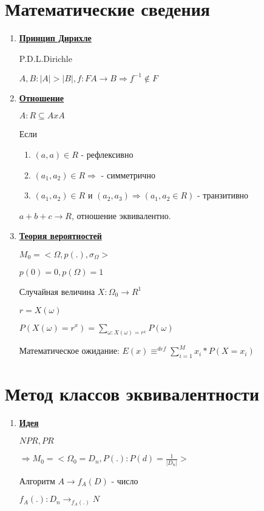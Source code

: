 \documentclass[12pt]{report}
\begin{document}
	\section*{Математические сведения}
	\begin{enumerate}
		\item \textbf{\underline{Принцип Дирихле}}\par
		P.D.L.Dirichle \par
		$A, B: |A| > |B|, f:F A\rightarrow B\Rightarrow f^{-1}\notin F$
		\item \textbf{\underline{Отношение}}\par
		$A: R \subseteq A x A$\par
		Если \begin{enumerate}
			\item $(a,a)\in R$ - рефлексивно
			\item $(a_1,a_2)\in R \Rightarrow$ - симметрично
			\item $(a_1,a_2)\in R$ и $(a_2,a_3)\Rightarrow (a_1,a_2\in R)$ - транзитивно
		\end{enumerate}\par
		$a + b + c\rightarrow R$, отношение эквивалентно.
		\item \textbf{\underline{Теория вероятностей}}\par
		$M_0 = <\Omega , p(.),\sigma_{\Omega}>$\par
		$p(0)=0,p(\Omega)=1$\par
		Случайная величина $X:\Omega_0 \rightarrow R^1$\par
		$r = X(\omega)$\par
		$P(X(\omega)=r^x)=\sum_{\omega :X(\omega)=r^x}P(\omega)$\par
		Математическое ожидание: $E(x)\equiv^{def} \sum_{i=1}^{M}x_i*P(X=x_i)$\par

	\end{enumerate}

	\section*{Метод классов эквивалентности}
	\begin{enumerate}
		\item \textbf{\underline{Идея}}\par
		$NPR,PR$\par
		$\Rightarrow M_0 = <\Omega_0=D_n, P(.):P(d)=\frac{1}{|D_n|}>$\par
		Алгоритм $A\rightarrow f_A(D)$ - число\par
		$f_A(.): D_n \rightarrow_{f_A(.)}N$
	\end{enumerate}
\end{document}

